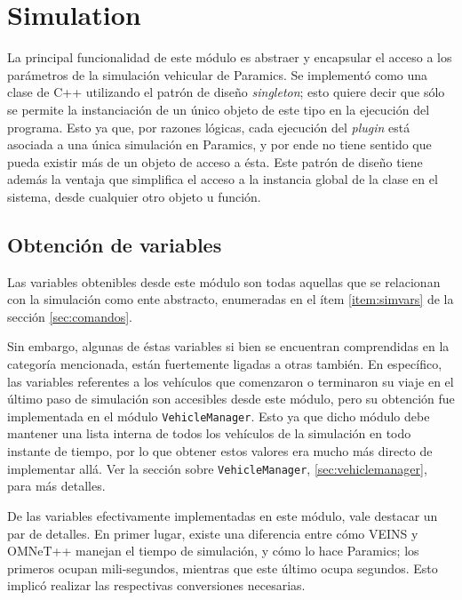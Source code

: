 \section{Simulation}\label{sec:simulation}

La principal funcionalidad de este módulo es abstraer y encapsular el acceso a los parámetros de la simulación vehicular de Paramics. Se implementó como una clase de C++ utilizando el patrón de diseño \emph{singleton}; esto quiere decir que sólo se permite la instanciación de un único objeto de este tipo en la ejecución del programa. Esto ya que, por razones lógicas, cada ejecución del \emph{plugin} está asociada a una única simulación en Paramics, y por ende no tiene sentido que pueda existir más de un objeto de acceso a ésta. Este patrón de diseño tiene además la ventaja que simplifica el acceso a la instancia global de la clase en el sistema, desde cualquier otro objeto u función.

\subsection{Obtención de variables}

Las variables obtenibles desde este módulo son todas aquellas que se relacionan con la simulación como ente abstracto, enumeradas en el ítem \ref{item:simvars} de la sección \ref{sec:comandos}.

Sin embargo, algunas de éstas variables si bien se encuentran comprendidas en la categoría mencionada, están fuertemente ligadas a otras también. En específico, las variables referentes a los vehículos que comenzaron o terminaron su viaje en el último paso de simulación son accesibles desde este módulo, pero su obtención fue implementada en el módulo \texttt{VehicleManager}. Esto ya que dicho módulo debe mantener una lista interna de todos los vehículos de la simulación en todo instante de tiempo, por lo que obtener estos valores era mucho más directo de implementar allá. Ver la sección sobre \texttt{VehicleManager}, \ref{sec:vehiclemanager}, para más detalles.

De las variables efectivamente implementadas en este módulo, vale destacar un par de detalles. En primer lugar, existe una diferencia entre cómo VEINS y OMNeT++ manejan el tiempo de simulación, y cómo lo hace Paramics; los primeros ocupan mili-segundos, mientras que este último ocupa segundos. Esto implicó realizar las respectivas conversiones necesarias.

